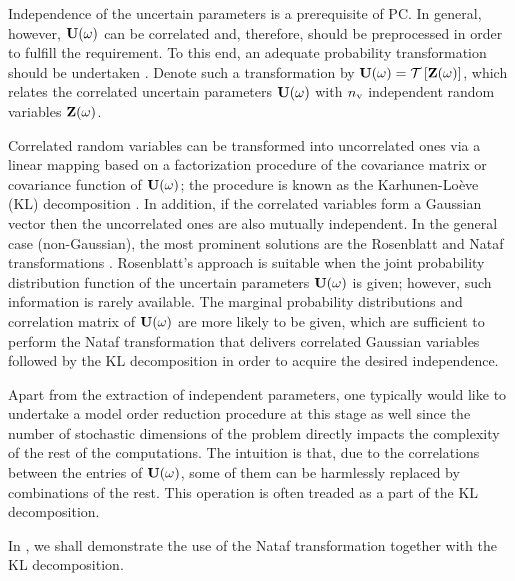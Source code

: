 Independence of the uncertain parameters is a prerequisite of PC.
In general, however, $\mathbf{U}(\omega)$ can be correlated and, therefore, should be preprocessed in order to fulfill the requirement.
To this end, an adequate probability transformation should be undertaken \cite{eldred2009}.
Denote such a transformation by $\vU(\o) = \oTransform{\vZ(\o)}$, which relates the correlated uncertain parameters $\mathbf{U}(\omega)$ with ${n_\text{v}}$ independent random variables $\mathbf{Z}(\omega)$.

Correlated random variables can be transformed into uncorrelated ones via a linear mapping based on a factorization procedure of the covariance matrix or covariance function of $\mathbf{U}(\omega)$; the procedure is known as the Karhunen-Lo\`{e}ve (KL) decomposition \cite{ghanem1991}.
In addition, if the correlated variables form a Gaussian vector then the uncorrelated ones are also mutually independent.
In the general case (non-Gaussian), the most prominent solutions are the Rosenblatt \cite{rosenblatt1952} and Nataf transformations \cite{li2008}.
Rosenblatt's approach is suitable when the joint probability distribution function of the uncertain parameters $\mathbf{U}(\omega)$ is given; however, such information is rarely available.
The marginal probability distributions and correlation matrix of $\mathbf{U}(\omega)$ are more likely to be given, which are sufficient to perform the Nataf transformation that delivers correlated Gaussian variables followed by the KL decomposition in order to acquire the desired independence.

Apart from the extraction of independent parameters, one typically would like to undertake a model order reduction procedure at this stage as well since the number of stochastic dimensions of the problem directly impacts the complexity of the rest of the computations.
The intuition is that, due to the correlations between the entries of $\mathbf{U}(\omega)$, some of them can be harmlessly replaced by combinations of the rest. This operation is often treaded as a part of the KL decomposition.

In , we shall demonstrate the use of the Nataf transformation together with the KL decomposition.
